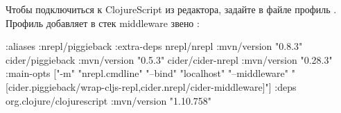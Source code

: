 
Чтобы подключиться к ClojureScript из редактора, задайте в файле  профиль . Профиль добавляет в стек middleware звено :

\begin{english}
  \begin{clojure}
{:aliases
 {:nrepl/piggieback
  {:extra-deps
   {nrepl/nrepl {:mvn/version "0.8.3"}
    cider/piggieback {:mvn/version "0.5.3"}
    cider/cider-nrepl {:mvn/version "0.28.3"}}
   :main-opts
   ["-m" "nrepl.cmdline"
    "--bind" "localhost"
    "--middleware" "[cider.piggieback/wrap-cljs-repl,cider.nrepl/cider-middleware]"]}}
 :deps
 {org.clojure/clojurescript {:mvn/version "1.10.758"}}}
  \end{clojure}
\end{english}


